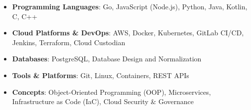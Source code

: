 \begin{itemize}
    \item \textbf{Programming Languages}: Go, JavaScript (Node.js), Python, Java, Kotlin, C, C++
    \item \textbf{Cloud Platforms \& DevOps}: AWS, Docker, Kubernetes, GitLab CI/CD, Jenkins, Terraform, Cloud Custodian
    \item \textbf{Databases}: PostgreSQL, Database Design and Normalization
    \item \textbf{Tools \& Platforms}: Git, Linux, Containers, REST APIs
    \item \textbf{Concepts}: Object-Oriented Programming (OOP), Microservices, Infrastructure as Code (IaC), Cloud Security \& Governance
\end{itemize}
